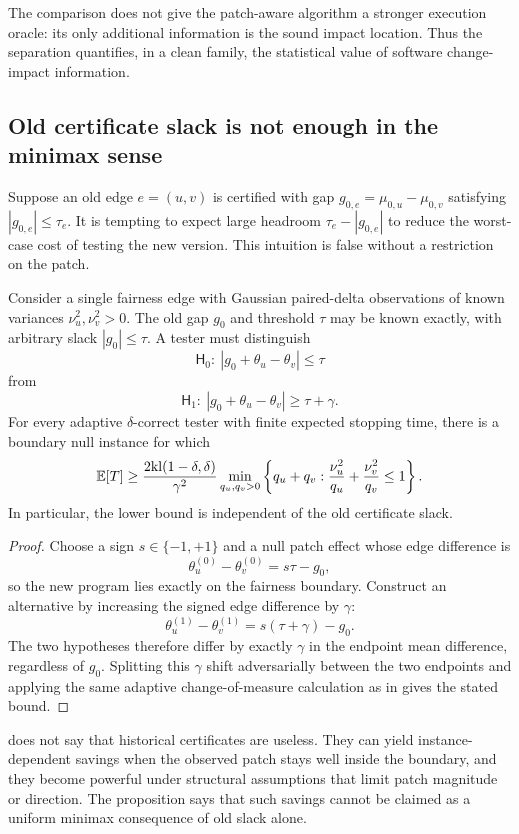 The comparison does not give the patch-aware algorithm a stronger execution
oracle: its only additional information is the sound impact location.  Thus the
separation quantifies, in a clean family, the statistical value of software
change-impact information.

\subsection{Old certificate slack is not enough in the minimax sense}

Suppose an old edge $e=(u,v)$ is certified with gap
$g_{0,e}=\mu_{0,u}-\mu_{0,v}$ satisfying $|g_{0,e}|\le\tau_e$.  It is tempting to
expect large headroom $\tau_e-|g_{0,e}|$ to reduce the worst-case cost of testing
the new version.  This intuition is false without a restriction on the patch.

\begin{proposition}
\label{prop:slack-no-free-lunch}
Consider a single fairness edge with Gaussian paired-delta observations of known
variances $\nu_u^2,\nu_v^2>0$.  The old gap $g_0$ and threshold $\tau$ may be known
exactly, with arbitrary slack $|g_0|\le\tau$.  A tester must distinguish
\[
\mathsf H_0:\ |g_0+\theta_u-\theta_v|\le\tau
\]
from
\[
\mathsf H_1:\ |g_0+\theta_u-\theta_v|\ge\tau+\gamma.
\]
For every adaptive $\delta$-correct tester with finite expected stopping time,
there is a boundary null instance for which
\[
\mathbb{E}[T]\ge
\frac{2\mathrm{kl}(1-\delta,\delta)}{\gamma^2}
\min_{q_u,q_v>0}
\left\{q_u+q_v:
\frac{\nu_u^2}{q_u}+\frac{\nu_v^2}{q_v}\le1
\right\}.
\]
In particular, the lower bound is independent of the old certificate slack.
\end{proposition}

\begin{proof}
Choose a sign $s\in\{-1,+1\}$ and a null patch effect whose edge difference is
\[
\theta_u^{(0)}-\theta_v^{(0)}=s\tau-g_0,
\]
so the new program lies exactly on the fairness boundary.  Construct an
alternative by increasing the signed edge difference by $\gamma$:
\[
\theta_u^{(1)}-\theta_v^{(1)}=s(\tau+\gamma)-g_0.
\]
The two hypotheses therefore differ by exactly $\gamma$ in the endpoint mean
difference, regardless of $g_0$.  Splitting this $\gamma$ shift adversarially
between the two endpoints and applying the same adaptive change-of-measure
calculation as in  gives the stated bound.
\end{proof}

 does not say that historical certificates are
useless.  They can yield instance-dependent savings when the observed patch stays
well inside the boundary, and they become powerful under structural assumptions
that limit patch magnitude or direction.  The proposition says that such savings
cannot be claimed as a uniform minimax consequence of old slack alone.


